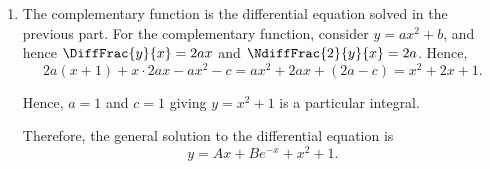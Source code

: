 \begin{enumerate}
    \item The complementary function is the differential equation solved in the previous part. For the complementary function, consider \(y = ax^2 + b\), and hence \(\DiffFrac{y}{x} = 2ax\) and \(\NdiffFrac{2}{y}{x} = 2a\). Hence,
          \[
              2a(x + 1) + x \cdot 2ax - ax^2 - c = ax^2 + 2ax + (2a - c) = x^2 + 2x + 1.
          \]

          Hence, \(a = 1\) and \(c = 1\) giving \(y = x^2 + 1\) is a particular integral.

          Therefore, the general solution to the differential equation is
          \[
              y = Ax + Be^{-x} + x^2 + 1.
          \]
\end{enumerate}
